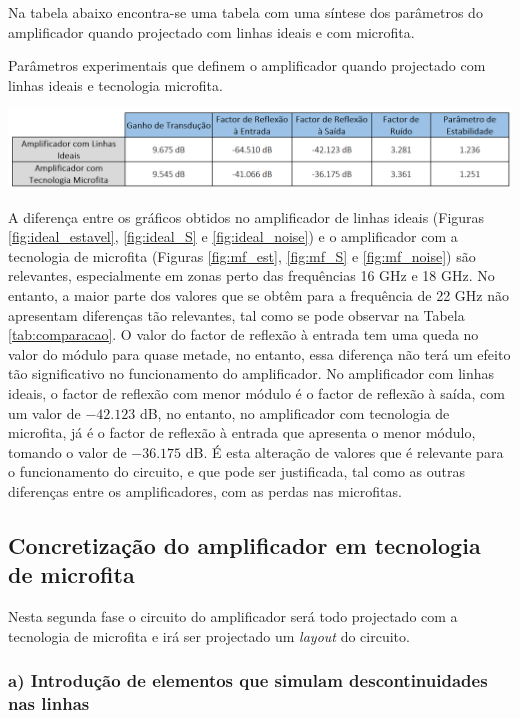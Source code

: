 \documentclass[11pt]{article}
\numberwithin{equation}{section}
\begin{document}
Na tabela abaixo encontra-se uma tabela com uma síntese dos parâmetros do amplificador quando projectado com linhas ideais e com microfita.

\begin{table}[H]
	\centering
	\caption{Parâmetros experimentais que definem o amplificador quando projectado com linhas ideais e tecnologia microfita.}
	\vspace{-1.5mm}
	\includegraphics[keepaspectratio=true, scale=0.45]{exps/comparacaoamp}
	\label{tab:comparacao}
\end{table}

A diferença entre os gráficos obtidos no amplificador de linhas ideais (Figuras \ref{fig:ideal_estavel}, \ref{fig:ideal_S} e \ref{fig:ideal_noise}) e o amplificador com a tecnologia de microfita (Figuras \ref{fig:mf_est}, \ref{fig:mf_S} e \ref{fig:mf_noise}) são relevantes, especialmente em zonas perto das frequências 16 GHz e 18 GHz. No entanto, a maior parte dos valores que se obtêm para a frequência de 22 GHz não apresentam diferenças tão relevantes, tal como se pode observar na Tabela \ref{tab:comparacao}. O valor do factor de reflexão à entrada tem uma queda no valor do módulo para quase metade, no entanto, essa diferença não terá um efeito tão significativo no funcionamento do amplificador. No amplificador com linhas ideais, o factor de reflexão com menor módulo é o factor de reflexão à saída, com um valor de $-42.123$ dB, no entanto, no amplificador com tecnologia de microfita, já é o factor de reflexão à entrada que apresenta o menor módulo, tomando o valor de $-36.175$ dB. É esta alteração de valores que é relevante para o funcionamento do circuito, e que pode ser justificada, tal como as outras diferenças entre os amplificadores, com as perdas nas microfitas.

\subsection{Concretização do amplificador em tecnologia de microfita}

Nesta segunda fase o circuito do amplificador será todo projectado com a tecnologia de microfita e irá ser projectado um \textit{layout} do circuito.

\subsubsection{a) Introdução de elementos que simulam descontinuidades nas linhas}
\end{document}
